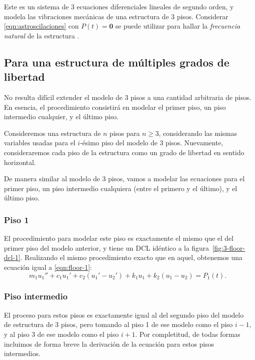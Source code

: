Este es un sistema de 3 ecuaciones diferenciales lineales de segundo orden, y modela las vibraciones mecánicas de una estructura de 3 pisos. Considerar \eqref{eqn:astroscilaciones} con \(P(t) = \mathbf{0}\) se puede utilizar para hallar la \textit{frecuencia natural} de la estructura \citep{rendon}.

\subsection{Para una estructura de múltiples grados de libertad}

No resulta difícil extender el modelo de 3 pisos a una cantidad arbitraria de pisos. En esencia, el procedimiento consistirá en modelar el primer piso, un piso intermedio cualquier, y el último piso.

Consideremos una estructura de \(n\) pisos para \(n \geq 3\), considerando las mismas variables usadas para el \(i\)-ésimo piso del modelo de 3 pisos. Nuevamente, consideraremos cada piso de la estructura como un grado de libertad en sentido horizontal.

De manera similar al modelo de 3 pisos, vamos a modelar las ecuaciones para el primer piso, un piso intermedio cualquiera (entre el primero y el último), y el último piso.

\subsubsection*{Piso 1}

El procedimiento para modelar este piso es exactamente el mismo que el del primer piso del modelo anterior, y tiene un DCL idéntico a la figura~\ref{fig:3-floor-dcl-1}. Realizando el mismo procedimiento exacto que en aquel, obtenemos una ecuación igual a \eqref{eqn:floor-1}:
\begin{equation}\label{eqn:final-floor-1}
    m_1 u_1'' + c_1 u_1' + c_2(u_1' - u_2') + k_1 u_1 + k_2(u_1 - u_2) = P_1(t)
.\end{equation}

\subsubsection*{Piso intermedio}

El proceso para estos pisos es exactamente igual al del segundo piso del modelo de estructura de 3 pisos, pero tomando al piso 1 de ese modelo como el piso \(i - 1\), y al piso 3 de ese modelo como el piso \(i + 1\). Por completitud, de todas formas incluimos de forma breve la derivación de la ecuación para estos pisos intermedios.

